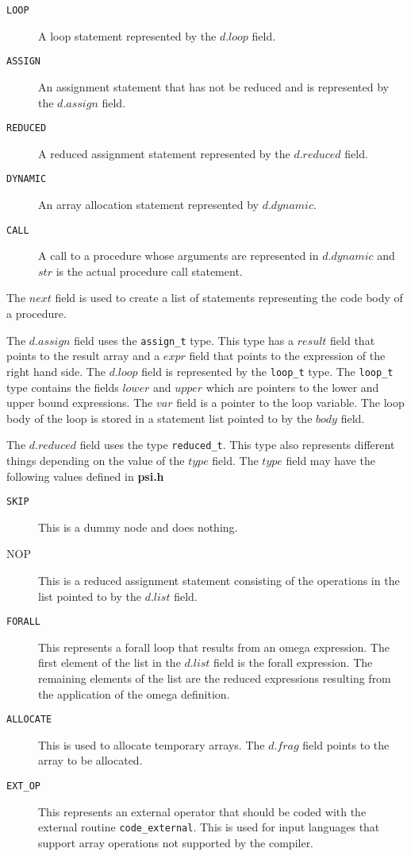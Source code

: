 \begin{description}
\item[{\tt LOOP}] A loop statement represented by the $d.loop$ field.
\item[{\tt ASSIGN}] An assignment statement that has not be reduced and
is represented by the $d.assign$ field.
\item[{\tt REDUCED}] A reduced assignment statement represented by the 
$d.reduced$ field.
\item[{\tt DYNAMIC}] An array allocation statement represented by $d.dynamic$.
\item[{\tt CALL}] A call to a procedure whose arguments are represented in
$d.dynamic$ and $str$ is the actual procedure call statement.
\end{description}

The $next$ field is used to create a list of statements representing the
code body of a procedure.

The $d.assign$ field uses the {\tt assign\_t} type.  This type has a $result$
field that points to the result array and a $expr$ field that points to
the expression of the right hand side.  The $d.loop$ field is represented
by the {\tt loop\_t} type.  The {\tt loop\_t} type contains the fields $lower$ and
$upper$ which are pointers to the lower and upper bound expressions.  The
$var$ field is a pointer to the loop variable.  The loop body of the
loop is stored in a statement list pointed to by the $body$ field.

The $d.reduced$ field uses the type {\tt reduced\_t}.  This type also represents
different things depending on the value of the $type$ field.  The $type$
field may have the following values defined in {\bf psi.h}

\begin{description}
\item[{\tt SKIP}]  This is a dummy node and does nothing.
\item[NOP] This is a reduced assignment statement consisting of the operations
in the list pointed to by the $d.list$ field.
\item[{\tt FORALL}]  This represents a forall loop that results from an omega
expression.  The first element of the list in the $d.list$ field is the
forall expression.  The remaining elements of the list are the reduced
expressions resulting from the application of the omega definition.
\item[{\tt ALLOCATE}]  This is used to allocate temporary arrays.  The $d.frag$
field points to the array to be allocated.
\item[{\tt EXT\_OP}]  This represents an external operator that should be coded with
the external routine {\tt code\_external}.  This is used for input languages that
support array operations not supported by the compiler.
\end{description}

